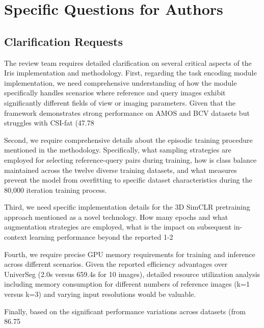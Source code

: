 \section{Specific Questions for Authors}
\label{sec:questions_authors}

\subsection{Clarification Requests}
The review team requires detailed clarification on several critical aspects of the Iris implementation and methodology. First, regarding the task encoding module implementation, we need comprehensive understanding of how the module specifically handles scenarios where reference and query images exhibit significantly different fields of view or imaging parameters. Given that the framework demonstrates strong performance on AMOS and BCV datasets but struggles with CSI-fat (47.78%

Second, we require comprehensive details about the episodic training procedure mentioned in the methodology. Specifically, what sampling strategies are employed for selecting reference-query pairs during training, how is class balance maintained across the twelve diverse training datasets, and what measures prevent the model from overfitting to specific dataset characteristics during the 80,000 iteration training process.

Third, we need specific implementation details for the 3D SimCLR pretraining approach mentioned as a novel technology. How many epochs and what augmentation strategies are employed, what is the impact on subsequent in-context learning performance beyond the reported 1-2%

Fourth, we require precise GPU memory requirements for training and inference across different scenarios. Given the reported efficiency advantages over UniverSeg (2.0s versus 659.4s for 10 images), detailed resource utilization analysis including memory consumption for different numbers of reference images (k=1 versus k=3) and varying input resolutions would be valuable.

Finally, based on the significant performance variations across datasets (from 86.75%

